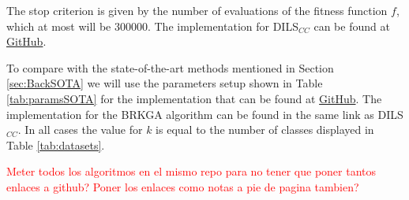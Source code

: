 \documentclass[review]{elsarticle}
\begin{document}
The stop criterion is given by the number of evaluations of the fitness function $f$, which at most will be 300000. The implementation for DILS$_{CC}$ can be found at \href{https://github.com/GermangUgr/DILS_CC}{GitHub}.

To compare with the state-of-the-art methods mentioned in Section \ref{sec:BackSOTA} we will use the parameters setup shown in Table \ref{tab:paramsSOTA} for the implementation that can be found at \href{https://github.com/GermangUgr/TFG/tree/master/Software}{GitHub}. The implementation for the BRKGA algorithm can be found in the same link as DILS$_{CC}$. In all cases the value for $k$ is equal to the number of classes displayed in Table \ref{tab:datasets}.

\textcolor{red}{Meter todos los algoritmos en el mismo repo para no tener que poner tantos enlaces a github? Poner los enlaces como notas a pie de pagina tambien?}

\begin{table}[!h]
	\centering
	\setlength{\tabcolsep}{7pt}
	\renewcommand{\arraystretch}{1.4}
		
	\caption{Parameters setup used for the state-of-the-art algorithms.}
	\label{tab:paramsSOTA}
\end{table}
\end{document}
